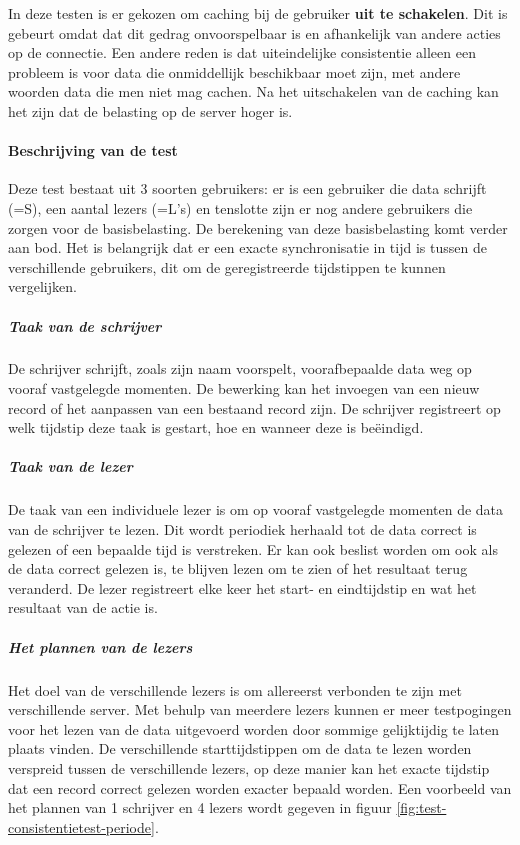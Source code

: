 In deze testen is er gekozen om caching bij de gebruiker \textbf{uit te schakelen}. Dit is gebeurt omdat dat dit gedrag onvoorspelbaar is en afhankelijk van andere acties op de connectie. Een andere reden is dat uiteindelijke consistentie alleen een probleem is voor data die onmiddellijk beschikbaar moet zijn, met andere woorden data die men niet mag cachen. Na het uitschakelen van de caching kan het zijn dat de belasting op de server hoger is. 

\paragraph{Beschrijving van de test} Deze test bestaat uit 3 soorten gebruikers: er is een gebruiker die data schrijft (=S), een aantal lezers (=L's) en tenslotte zijn er nog andere gebruikers die zorgen voor de basisbelasting. De berekening van deze basisbelasting komt verder aan bod.  
Het is belangrijk dat er een exacte synchronisatie in tijd is tussen de verschillende gebruikers, dit om de geregistreerde tijdstippen te kunnen vergelijken.


\subparagraph{Taak van de schrijver} De schrijver schrijft, zoals zijn naam voorspelt, voorafbepaalde data weg op vooraf vastgelegde momenten. De bewerking kan het invoegen van een nieuw record of het aanpassen van een bestaand record zijn. De schrijver registreert op welk tijdstip deze taak is gestart, hoe en wanneer deze is beëindigd.

\subparagraph{Taak van de lezer} De taak van een individuele lezer is om op vooraf vastgelegde momenten de data van de schrijver te lezen. Dit wordt periodiek herhaald tot de data correct is gelezen of een bepaalde tijd is verstreken. Er kan ook beslist worden om ook als de data correct gelezen is, te blijven lezen om te zien of het resultaat terug veranderd. De lezer registreert elke keer het start- en eindtijdstip en wat het resultaat van de actie is.  

\subparagraph{Het plannen van de lezers} Het doel van de verschillende lezers is om allereerst verbonden te zijn met verschillende server. Met behulp van meerdere lezers kunnen er meer testpogingen voor het lezen van de data uitgevoerd worden door sommige gelijktijdig te laten plaats vinden. De verschillende starttijdstippen om de data te lezen worden verspreid tussen de verschillende lezers, op deze manier kan het exacte tijdstip dat een record correct gelezen worden exacter bepaald worden. Een voorbeeld van het plannen van 1 schrijver en 4 lezers wordt gegeven in figuur \ref{fig:test-consistentietest-periode}. 

